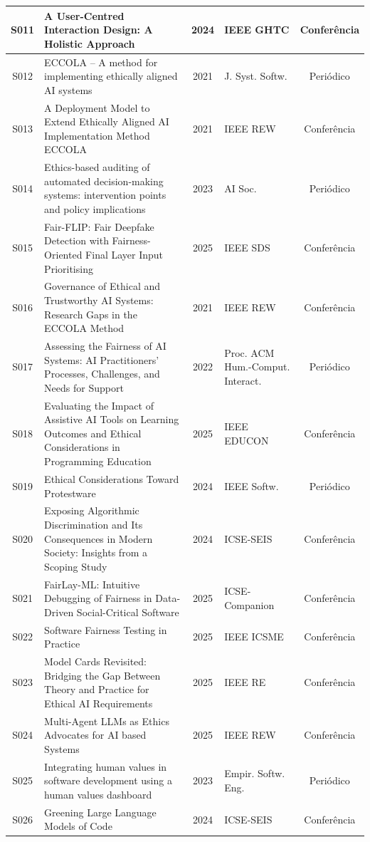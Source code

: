 \begin{longtable}{|c|p{7cm}|c|p{3.5cm}|c|}
S011 & A User-Centred Interaction Design: A Holistic Approach & 2024 & IEEE GHTC & Conferência \\ \hline
S012 & ECCOLA -- A method for implementing ethically aligned AI systems & 2021 & J. Syst. Softw. & Periódico \\ \hline
S013 & A Deployment Model to Extend Ethically Aligned AI Implementation Method ECCOLA & 2021 & IEEE REW & Conferência \\ \hline
S014 & Ethics-based auditing of automated decision-making systems: intervention points and policy implications & 2023 & AI Soc. & Periódico \\ \hline
S015 & Fair-FLIP: Fair Deepfake Detection with Fairness-Oriented Final Layer Input Prioritising & 2025 & IEEE SDS & Conferência \\ \hline
S016 & Governance of Ethical and Trustworthy AI Systems: Research Gaps in the ECCOLA Method & 2021 & IEEE REW & Conferência \\ \hline
S017 & Assessing the Fairness of AI Systems: AI Practitioners' Processes, Challenges, and Needs for Support & 2022 & Proc. ACM Hum.-Comput. Interact. & Periódico \\ \hline
S018 & Evaluating the Impact of Assistive AI Tools on Learning Outcomes and Ethical Considerations in Programming Education & 2025 & IEEE EDUCON & Conferência \\ \hline
S019 & Ethical Considerations Toward Protestware & 2024 & IEEE Softw. & Periódico \\ \hline
S020 & Exposing Algorithmic Discrimination and Its Consequences in Modern Society: Insights from a Scoping Study & 2024 & ICSE-SEIS & Conferência \\ \hline
S021 & FairLay-ML: Intuitive Debugging of Fairness in Data-Driven Social-Critical Software & 2025 & ICSE-Companion & Conferência \\ \hline
S022 & Software Fairness Testing in Practice & 2025 & IEEE ICSME & Conferência \\ \hline
S023 & Model Cards Revisited: Bridging the Gap Between Theory and Practice for Ethical AI Requirements & 2025 & IEEE RE & Conferência \\ \hline
S024 & Multi-Agent LLMs as Ethics Advocates for AI based Systems & 2025 & IEEE REW & Conferência \\ \hline
S025 & Integrating human values in software development using a human values dashboard & 2023 & Empir. Softw. Eng. & Periódico \\ \hline
S026 & Greening Large Language Models of Code & 2024 & ICSE-SEIS & Conferência \\ \hline

\end{longtable}
